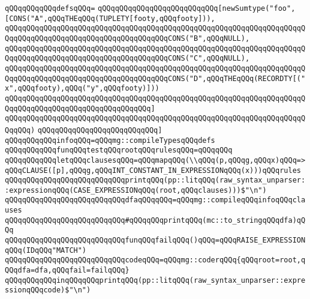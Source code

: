 \newline
\verb|qQQqqQQqqQQqdefsqQQq=|\newline
\verb|qQQqqQQqqQQqqQQqqQQqqQQqqQQq[newSumtype("foo",[CONS("A",qQQqTHEqQQq(TUPLETY[footy,qQQqfooty])),|\newline
\verb|qQQqqQQqqQQqqQQqqQQqqQQqqQQqqQQqqQQqqQQqqQQqqQQqqQQqqQQqqQQqqQQqqQQqqQQqqQQqqQQqqQQqqQQqqQQqqQQqqQQqqQQqqQQqCONS("B",qQQqNULL),|\newline
\verb|qQQqqQQqqQQqqQQqqQQqqQQqqQQqqQQqqQQqqQQqqQQqqQQqqQQqqQQqqQQqqQQqqQQqqQQqqQQqqQQqqQQqqQQqqQQqqQQqqQQqqQQqqQQqCONS("C",qQQqNULL),|\newline
\verb|qQQqqQQqqQQqqQQqqQQqqQQqqQQqqQQqqQQqqQQqqQQqqQQqqQQqqQQqqQQqqQQqqQQqqQQqqQQqqQQqqQQqqQQqqQQqqQQqqQQqqQQqqQQqCONS("D",qQQqTHEqQQq(RECORDTY[("x",qQQqfooty),qQQq("y",qQQqfooty)]))|\newline
\verb|qQQqqQQqqQQqqQQqqQQqqQQqqQQqqQQqqQQqqQQqqQQqqQQqqQQqqQQqqQQqqQQqqQQqqQQqqQQqqQQqqQQqqQQqqQQqqQQqqQQqqQQq]|\newline
\verb|qQQqqQQqqQQqqQQqqQQqqQQqqQQqqQQqqQQqqQQqqQQqqQQqqQQqqQQqqQQqqQQqqQQqqQQqqQQq)|\newline
\verb|qQQqqQQqqQQqqQQqqQQqqQQqqQQq]|\newline
\verb|qQQqqQQqqQQqinfoqQQq=qQQqmg::compileTypesqQQqdefs|\newline
\newline
\verb|qQQqqQQqqQQqfunqQQqtestqQQqrootqQQqrulesqQQq=qQQqqQQq|\newline
\verb|qQQqqQQqqQQqletqQQqclausesqQQq=qQQqmapqQQq(\\qQQq(p,qQQqg,qQQqx)qQQq=>qQQqCLAUSE([p],qQQqg,qQQqINT_CONSTANT_IN_EXPRESSIONqQQq(x)))qQQqrules|\newline
\verb|qQQqqQQqqQQqqQQqqQQqqQQqqQQqprintqQQq(pp::litqQQq(raw_syntax_unparser::expressionqQQq(CASE_EXPRESSIONqQQq(root,qQQqclauses)))$"\n")|\newline
\verb|qQQqqQQqqQQqqQQqqQQqqQQqqQQqdfaqQQqqQQq=qQQqmg::compileqQQqinfoqQQqclauses|\newline
\verb|qQQqqQQqqQQqqQQqqQQqqQQqqQQq#qQQqqQQqprintqQQq(mc::to_stringqQQqdfa)qQQq|\newline
\verb|qQQqqQQqqQQqqQQqqQQqqQQqqQQqfunqQQqfailqQQq()qQQq=qQQqRAISE_EXPRESSIONqQQq(IDqQQq"MATCH")|\newline
\verb|qQQqqQQqqQQqqQQqqQQqqQQqqQQqcodeqQQq=qQQqmg::coderqQQq{qQQqroot=root,qQQqdfa=dfa,qQQqfail=failqQQq}|\newline
\verb|qQQqqQQqqQQqinqQQqqQQqprintqQQq(pp::litqQQq(raw_syntax_unparser::expressionqQQqcode)$"\n")|\newline
